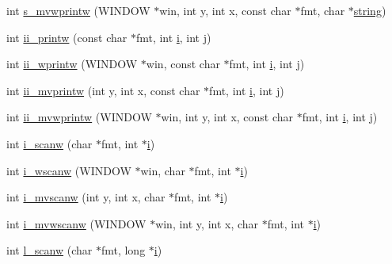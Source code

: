 \begin{DoxyCompactItemize}
\item 
int \hyperlink{C-macros_8c_a34a56ec22fc3813b4971c20eb6d699ff}{s\+\_\+mvwprintw} (W\+I\+N\+D\+OW $\ast$win, int y, int x, const char $\ast$fmt, char $\ast$\hyperlink{what__overview_81_8txt_a7d189cc480786c3c65688ced463aedcb}{string})
\item 
int \hyperlink{C-macros_8c_a485ef33f3e0fb3900f69d4b869b619f1}{ii\+\_\+printw} (const char $\ast$fmt, int \hyperlink{intro__blas1_83_8txt_a8ba82a50c0c2c12d5f6a77f7e4651c0b}{i}, int \hyperlink{exit_87_8txt_a8921ef29c441e427867c54bd3b2462ba}{j})
\item 
int \hyperlink{C-macros_8c_ab8f1d3103aca01f9fdbbf7017ecf968b}{ii\+\_\+wprintw} (W\+I\+N\+D\+OW $\ast$win, const char $\ast$fmt, int \hyperlink{intro__blas1_83_8txt_a8ba82a50c0c2c12d5f6a77f7e4651c0b}{i}, int \hyperlink{exit_87_8txt_a8921ef29c441e427867c54bd3b2462ba}{j})
\item 
int \hyperlink{C-macros_8c_ada22ee1895688f4926d3109021e89e33}{ii\+\_\+mvprintw} (int y, int x, const char $\ast$fmt, int \hyperlink{intro__blas1_83_8txt_a8ba82a50c0c2c12d5f6a77f7e4651c0b}{i}, int \hyperlink{exit_87_8txt_a8921ef29c441e427867c54bd3b2462ba}{j})
\item 
int \hyperlink{C-macros_8c_aba1dee7f00e339e2bcd867896705bbf0}{ii\+\_\+mvwprintw} (W\+I\+N\+D\+OW $\ast$win, int y, int x, const char $\ast$fmt, int \hyperlink{intro__blas1_83_8txt_a8ba82a50c0c2c12d5f6a77f7e4651c0b}{i}, int \hyperlink{exit_87_8txt_a8921ef29c441e427867c54bd3b2462ba}{j})
\item 
int \hyperlink{C-macros_8c_a753154950200b717bb172493ec09eca0}{i\+\_\+scanw} (char $\ast$fmt, int $\ast$\hyperlink{intro__blas1_83_8txt_a8ba82a50c0c2c12d5f6a77f7e4651c0b}{i})
\item 
int \hyperlink{C-macros_8c_a3fcdb7ea0752fda8505aa52f2306619f}{i\+\_\+wscanw} (W\+I\+N\+D\+OW $\ast$win, char $\ast$fmt, int $\ast$\hyperlink{intro__blas1_83_8txt_a8ba82a50c0c2c12d5f6a77f7e4651c0b}{i})
\item 
int \hyperlink{C-macros_8c_a31b17f5fa08e8b64e9b314300f548c33}{i\+\_\+mvscanw} (int y, int x, char $\ast$fmt, int $\ast$\hyperlink{intro__blas1_83_8txt_a8ba82a50c0c2c12d5f6a77f7e4651c0b}{i})
\item 
int \hyperlink{C-macros_8c_ac0518e313ddc0b8e826cfb049c36e257}{i\+\_\+mvwscanw} (W\+I\+N\+D\+OW $\ast$win, int y, int x, char $\ast$fmt, int $\ast$\hyperlink{intro__blas1_83_8txt_a8ba82a50c0c2c12d5f6a77f7e4651c0b}{i})
\item 
int \hyperlink{C-macros_8c_ac941da9228821610096cdf7a8dc6af56}{l\+\_\+scanw} (char $\ast$fmt, long $\ast$\hyperlink{intro__blas1_83_8txt_a8ba82a50c0c2c12d5f6a77f7e4651c0b}{i})

\end{DoxyCompactItemize}
